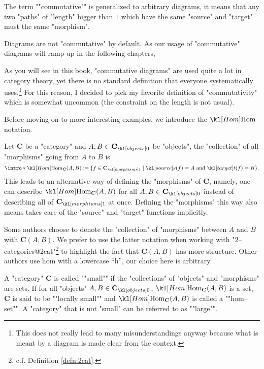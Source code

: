 \documentclass[main.tex]{subfiles}
\begin{document}
\begin{defn}[Commutativity]
	\AP The term ""commutative"" is generalized to arbitrary diagrams, it means that any two "paths" of "length" bigger than $1$ which have the same "source" and "target" must  the same "morphism".
\end{defn}
\begin{warn}
	Diagrams are not "commutative" by default. As our usage of "commutative" diagrams will ramp up in the following chapters, %
\end{warn}
\begin{rem}[Convention]%
	As you will see in this book, "commutative diagrams" are used quite a lot in category theory, yet there is no standard definition that everyone systematically uses.\footnote{This does not really lead to many misunderstandings anyway because what is meant by a diagram is made clear from the context.} For this reason, I decided to pick my favorite definition of "commutativity" which is somewhat uncommon (the constraint on the length is not usual).
\end{rem}
Before moving on to more interesting examples, we introduce the $\Hom$ notation.
\begin{defn}[$\Hom$]
	\AP Let $\mathbf{C}$ be a "category" and $A,B \in \obj{\mathbf{C}}$ be "objects", the "collection" of all "morphisms" going from $A$ to $B$ is 
	\[\intro*\Hom_{\mathbf{C}}(A,B) := \{f \in \mor{\mathbf{C}} \mid \source(f) = A \text{ and } \target(f) = B\}.\]
	This leads to an alternative way of defining the "morphisms" of $\mathbf{C}$, namely, one can describe $\Hom_{\mathbf{C}}(A,B)$ for all $A, B \in \obj{\mathbf{C}}$ instead of describing all of $\mor{\mathbf{C}}$ at once. Defining the "morphisms" this way also means takes care of the "source" and "target" functions implicitly.
\end{defn}
\begin{rem}[Notation]
    Some authors choose to denote the "collection" of "morphisms" between $A$ and $B$ with $\mathbf{C}(A,B)$. We prefer to use the latter notation when working with "$2$--categories@2cat"\footnote{c.f. Definition \ref{defn:2cat}.} to highlight the fact that $\mathbf{C}(A,B)$ has more structure. Other authors use $\mathrm{hom}$ with a lowercase ``h'', our choice here is arbitrary.
\end{rem}
\begin{defn}[Smallness]
	\AP A "category" $\mathbf{C}$ is called ""small"" if the "collections" of "objects" and "morphisms" are sets. \AP If for all "objects" $A,B \in \obj{\mathbf{C}}$, $\Hom_{\mathbf{C}}(A,B)$ is a set, $\mathbf{C}$ is said to be ""locally small"" and $\Hom_{\mathbf{C}}(A,B)$ is called a ""hom--set"". \AP A "category" that is not "small" can be referred to as ""large"".%
\end{defn}
\end{document}
